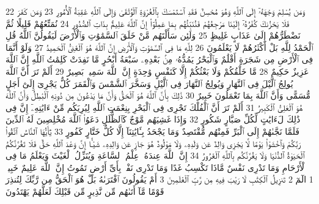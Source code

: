{\tiny\colorbox{cl_aya}{22}} وَمَن يُسْلِمْ وَجْهَهُۥٓ إِلَى ٱللَّهِ وَهُوَ مُحْسِنٌ فَقَدِ ٱسْتَمْسَكَ بِٱلْعُرْوَةِ ٱلْوُثْقَىٰ وَإِلَى ٱللَّهِ عَٰقِبَةُ ٱلْأُمُورِ
{\tiny\colorbox{cl_aya}{23}} وَمَن كَفَرَ فَلَا يَحْزُنكَ كُفْرُهُۥٓ إِلَيْنَا مَرْجِعُهُمْ فَنُنَبِّئُهُم بِمَا عَمِلُوٓا۟ إِنَّ ٱللَّهَ عَلِيمٌۢ بِذَاتِ ٱلصُّدُورِ
{\tiny\colorbox{cl_aya}{24}} نُمَتِّعُهُمْ قَلِيلًا ثُمَّ نَضْطَرُّهُمْ إِلَىٰ عَذَابٍ غَلِيظٍ
{\tiny\colorbox{cl_aya}{25}} وَلَئِن سَأَلْتَهُم مَّنْ خَلَقَ ٱلسَّمَٰوَٰتِ وَٱلْأَرْضَ لَيَقُولُنَّ ٱللَّهُ قُلِ ٱلْحَمْدُ لِلَّهِ بَلْ أَكْثَرُهُمْ لَا يَعْلَمُونَ
{\tiny\colorbox{cl_aya}{26}} لِلَّهِ مَا فِى ٱلسَّمَٰوَٰتِ وَٱلْأَرْضِ إِنَّ ٱللَّهَ هُوَ ٱلْغَنِىُّ ٱلْحَمِيدُ
{\tiny\colorbox{cl_aya}{27}} وَلَوْ أَنَّمَا فِى ٱلْأَرْضِ مِن شَجَرَةٍ أَقْلَٰمٌ وَٱلْبَحْرُ يَمُدُّهُۥ مِنۢ بَعْدِهِۦ سَبْعَةُ أَبْحُرٍ مَّا نَفِدَتْ كَلِمَٰتُ ٱللَّهِ إِنَّ ٱللَّهَ عَزِيزٌ حَكِيمٌ
{\tiny\colorbox{cl_aya}{28}} مَّا خَلْقُكُمْ وَلَا بَعْثُكُمْ إِلَّا كَنَفْسٍ وَٰحِدَةٍ إِنَّ ٱللَّهَ سَمِيعٌۢ بَصِيرٌ
{\tiny\colorbox{cl_aya}{29}} أَلَمْ تَرَ أَنَّ ٱللَّهَ يُولِجُ ٱلَّيْلَ فِى ٱلنَّهَارِ وَيُولِجُ ٱلنَّهَارَ فِى ٱلَّيْلِ وَسَخَّرَ ٱلشَّمْسَ وَٱلْقَمَرَ كُلٌّ يَجْرِىٓ إِلَىٰٓ أَجَلٍ مُّسَمًّى وَأَنَّ ٱللَّهَ بِمَا تَعْمَلُونَ خَبِيرٌ
{\tiny\colorbox{cl_aya}{30}} ذَٰلِكَ بِأَنَّ ٱللَّهَ هُوَ ٱلْحَقُّ وَأَنَّ مَا يَدْعُونَ مِن دُونِهِ ٱلْبَٰطِلُ وَأَنَّ ٱللَّهَ هُوَ ٱلْعَلِىُّ ٱلْكَبِيرُ
{\tiny\colorbox{cl_aya}{31}} أَلَمْ تَرَ أَنَّ ٱلْفُلْكَ تَجْرِى فِى ٱلْبَحْرِ بِنِعْمَتِ ٱللَّهِ لِيُرِيَكُم مِّنْ ءَايَٰتِهِۦٓ إِنَّ فِى ذَٰلِكَ لَءَايَٰتٍ لِّكُلِّ صَبَّارٍ شَكُورٍ
{\tiny\colorbox{cl_aya}{32}} وَإِذَا غَشِيَهُم مَّوْجٌ كَٱلظُّلَلِ دَعَوُا۟ ٱللَّهَ مُخْلِصِينَ لَهُ ٱلدِّينَ فَلَمَّا نَجَّىٰهُمْ إِلَى ٱلْبَرِّ فَمِنْهُم مُّقْتَصِدٌ وَمَا يَجْحَدُ بِـَٔايَٰتِنَآ إِلَّا كُلُّ خَتَّارٍ كَفُورٍ
{\tiny\colorbox{cl_aya}{33}} يَٰٓأَيُّهَا ٱلنَّاسُ ٱتَّقُوا۟ رَبَّكُمْ وَٱخْشَوْا۟ يَوْمًا لَّا يَجْزِى وَالِدٌ عَن وَلَدِهِۦ وَلَا مَوْلُودٌ هُوَ جَازٍ عَن وَالِدِهِۦ شَيْـًٔا إِنَّ وَعْدَ ٱللَّهِ حَقٌّ فَلَا تَغُرَّنَّكُمُ ٱلْحَيَوٰةُ ٱلدُّنْيَا وَلَا يَغُرَّنَّكُم بِٱللَّهِ ٱلْغَرُورُ
{\tiny\colorbox{cl_aya}{34}} إِنَّ ٱللَّهَ عِندَهُۥ عِلْمُ ٱلسَّاعَةِ وَيُنَزِّلُ ٱلْغَيْثَ وَيَعْلَمُ مَا فِى ٱلْأَرْحَامِ وَمَا تَدْرِى نَفْسٌ مَّاذَا تَكْسِبُ غَدًا وَمَا تَدْرِى نَفْسٌۢ بِأَىِّ أَرْضٍ تَمُوتُ إِنَّ ٱللَّهَ عَلِيمٌ خَبِيرٌۢ
{\tiny\colorbox{cl_aya}{1}} الٓمٓ
{\tiny\colorbox{cl_aya}{2}} تَنزِيلُ ٱلْكِتَٰبِ لَا رَيْبَ فِيهِ مِن رَّبِّ ٱلْعَٰلَمِينَ
{\tiny\colorbox{cl_aya}{3}} أَمْ يَقُولُونَ ٱفْتَرَىٰهُ بَلْ هُوَ ٱلْحَقُّ مِن رَّبِّكَ لِتُنذِرَ قَوْمًا مَّآ أَتَىٰهُم مِّن نَّذِيرٍ مِّن قَبْلِكَ لَعَلَّهُمْ يَهْتَدُونَ
